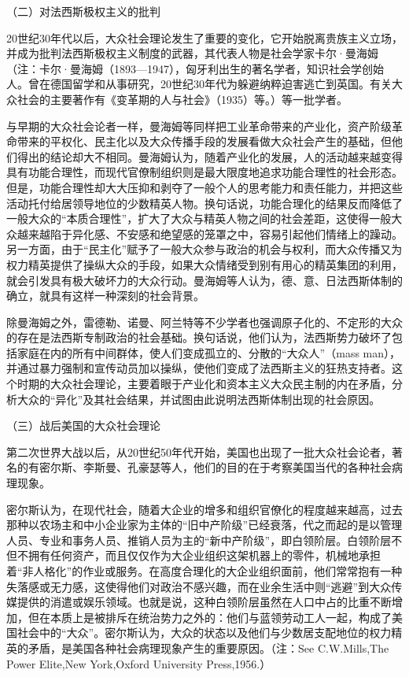 \documentclass[UTF8,12pt]{ctexart}
\numberwithin{equation}{section} %
\numberwithin{figure}{section}
\numberwithin{table}{section}
\begin{document}
	（二）对法西斯极权主义的批判
	
	20世纪30年代以后，大众社会理论发生了重要的变化，它开始脱离贵族主义立场，并成为批判法西斯极权主义制度的武器，其代表人物是社会学家卡尔·曼海姆（注：卡尔·曼海姆（1893—1947），匈牙利出生的著名学者，知识社会学创始人。曾在德国留学和从事研究，20世纪30年代为躲避纳粹迫害逃亡到英国。有关大众社会的主要著作有《变革期的人与社会》（1935）等。）等一批学者。
	
	与早期的大众社会论者一样，曼海姆等同样把工业革命带来的产业化，资产阶级革命带来的平权化、民主化以及大众传播手段的发展看做大众社会产生的基础，但他们得出的结论却大不相同。曼海姆认为，随着产业化的发展，人的活动越来越变得具有功能合理性，而现代官僚制组织则是最大限度地追求功能合理性的社会形态。但是，功能合理性却大大压抑和剥夺了一般个人的思考能力和责任能力，并把这些活动托付给居领导地位的少数精英人物。换句话说，功能合理化的结果反而降低了一般大众的“本质合理性”，扩大了大众与精英人物之间的社会差距，这使得一般大众越来越陷于异化感、不安感和绝望感的笼罩之中，容易引起他们情绪上的躁动。另一方面，由于“民主化”赋予了一般大众参与政治的机会与权利，而大众传播又为权力精英提供了操纵大众的手段，如果大众情绪受到别有用心的精英集团的利用，就会引发具有极大破坏力的大众行动。曼海姆等人认为，德、意、日法西斯体制的确立，就具有这样一种深刻的社会背景。
	
	除曼海姆之外，雷德勒、诺曼、阿兰特等不少学者也强调原子化的、不定形的大众的存在是法西斯专制政治的社会基础。换句话说，他们认为，法西斯势力破坏了包括家庭在内的所有中间群体，使人们变成孤立的、分散的“大众人”（mass man），并通过暴力强制和宣传动员加以操纵，使他们变成了法西斯主义的狂热支持者。这个时期的大众社会理论，主要着眼于产业化和资本主义大众民主制的内在矛盾，分析大众的“异化”及其社会结果，并试图由此说明法西斯体制出现的社会原因。
	
	（三）战后美国的大众社会理论
	
	第二次世界大战以后，从20世纪50年代开始，美国也出现了一批大众社会论者，著名的有密尔斯、李斯曼、孔豪瑟等人，他们的目的在于考察美国当代的各种社会病理现象。
	
	密尔斯认为，在现代社会，随着大企业的增多和组织官僚化的程度越来越高，过去那种以农场主和中小企业家为主体的“旧中产阶级”已经衰落，代之而起的是以管理人员、专业和事务人员、推销人员为主的“新中产阶级”，即白领阶层。白领阶层不但不拥有任何资产，而且仅仅作为大企业组织这架机器上的零件，机械地承担着“非人格化”的作业或服务。在高度合理化的大企业组织面前，他们常常抱有一种失落感或无力感，这使得他们对政治不感兴趣，而在业余生活中则“逃避”到大众传媒提供的消遣或娱乐领域。也就是说，这种白领阶层虽然在人口中占的比重不断增加，但在本质上是被排斥在统治势力之外的：他们与蓝领劳动工人一起，构成了美国社会中的“大众”。密尔斯认为，大众的状态以及他们与少数居支配地位的权力精英的矛盾，是美国各种社会病理现象产生的重要原因。（注：See C.W.Mills,The Power Elite,New York,Oxford University Press,1956.）
	
\end{document}
